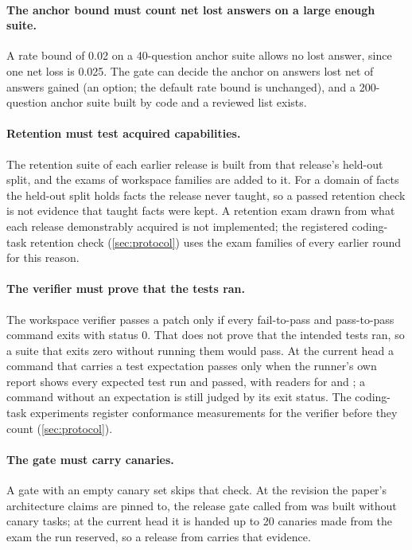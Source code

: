 \paragraph{The anchor bound must count net lost answers on a large enough suite.} A rate bound of
0.02 on a 40-question anchor suite allows no lost answer, since one net loss is 0.025. The gate
can decide the anchor on answers lost net of answers gained (an option; the default rate bound
is unchanged), and a 200-question anchor suite built by code and a reviewed list
exists.

\paragraph{Retention must test acquired capabilities.} The retention suite of each earlier
release is built from that release's held-out split, and the exams of workspace families are
added to it. For a domain of facts the held-out split holds facts the release never
taught, so a passed retention check is not evidence that taught facts were kept. A retention
exam drawn from what each release demonstrably acquired is not implemented; the
registered coding-task retention check (\cref{sec:protocol}) uses the exam families of every
earlier round for this reason.

\paragraph{The verifier must prove that the tests ran.} The workspace verifier passes a patch
only if every fail-to-pass and pass-to-pass command exits with status 0. That does not
prove that the intended tests ran, so a suite that exits zero without running them would pass.
At the current head a command that carries a test expectation passes only when the runner's own
report shows every expected test run and passed, with readers for  and
; a command without an expectation is still judged by its exit status. The
coding-task experiments register conformance measurements for the verifier before they count
(\cref{sec:protocol}).

\paragraph{The gate must carry canaries.} A gate with an empty canary set skips that check. At the
revision the paper's architecture claims are pinned to, the release gate called from 
was built without canary tasks; at the current head it is handed up to 20 canaries made from
the exam the run reserved, so a release from  carries that evidence.

